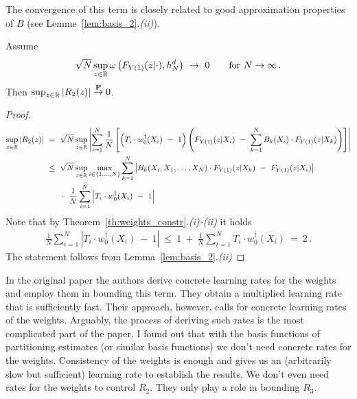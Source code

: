 The convergence of this term is closely related to good approximation properties of $B$ (see Lemme~\ref{lem:basis_2}.\textit{(ii)}). 
\begin{lemma}
\label{aa:mean:l:r2}
  Assume
  \begin{align*}
    \sqrt{N}
    \sup_{z\in\R}
    \omega
    \left( 
      F_{Y(1)}(z|\cdot)
      ,h_N^d
    \right)
    \ 
    \to 
    \ 
    0
    \qquad
    \text{for}\ 
    N\to\infty
    \,.
  \end{align*}
  Then $\sup_{z\in\mathbb{R}}|R_2(z)|\overset{\mathbf{P}}{\to} 0$.
\end{lemma}
\begin{proof}
  \begin{align*}
    \sup_{z\in\R}
    \left| R_2(z) \right|
    &
    \
    =
    \
  \sqrt{N}
  \sup_{z\in\R}
  \left|
    \sum_{i=1}^{N} 
    \frac{1}{N}
    \left[ 
      \left( 
    T_i\cdot w_0^\dagger(X_i) 
    \ 
    -
    \ 
    1 
      \right)
    \left( 
  F_{Y(1)}(z|X_i)
    \ 
    -
    \ 
    \sum_{k=1}^{N} 
    B_k(X_i)
    \cdot
  F_{Y(1)}(z|X_k)
    \right)
    \right]
  \right|
\\
    &
    \  
    \le
    \  
        \sqrt{N}
        \sup_{z\in\R}
        \max_{i\in \left\{ 1,\ldots,N \right\}}
        \sum_{k=1}^{N}
            \left|
        B_k(X_i,X_1,\ldots,X_N)
        \cdot
        F_{Y(1)}(z|X_k)
            \ 
            -
            \ 
        F_{Y(1)}(z|X_i)
            \right|
            \\
            &
            \qquad
            \cdot
            \ 
    \frac{1}{N}
    \sum_{i=1}^{N} 
      \left| 
    T_i\cdot w^\dagger_0(X_i) 
    \ 
    -
    \ 
    1 
      \right|
  \end{align*}
  Note that by Theorem~\ref{th:weights_constr}.\textit{(i)-(ii)}
  it holds
  \begin{align*}
    \frac{1}{N}
    \sum_{i=1}^{N} 
      \left| 
    T_i\cdot w^\dagger_0(X_i) 
    \ 
    -
    \ 
    1 
      \right|
      \ 
    \le
      \ 
    1
    \ 
    +
    \ 
    \frac{1}{N}
    \sum_{i=1}^{N} 
    T_i\cdot w^\dagger_0(X_i) 
    \ 
    =
    \ 
    2
    \,.
  \end{align*}
  The statement follows from Lemma~\ref{lem:basis_2}.\textit{(ii)}
\end{proof}
\begin{remark}
In the original paper \cite{Wang2019} the authors derive concrete learning rates for the weights and employ them in bounding this term. They obtain a multiplied learning rate that is sufficiently fast. Their approach, however, calls for concrete learning rates of the weights. Arguably, the process of deriving such rates is the most complicated part of the paper. 
I found out that with the basis functions of partitioning estimates (or similar basis functions) we don't need concrete rates for the weights. 
Consistency of the weights is enough and gives us an (arbitrarily slow but sufficient) learning rate to establish the results.
We don't even need rates for the weights to control $R_2$.
They only play a role in bounding $R_3$. 
\end{remark}



